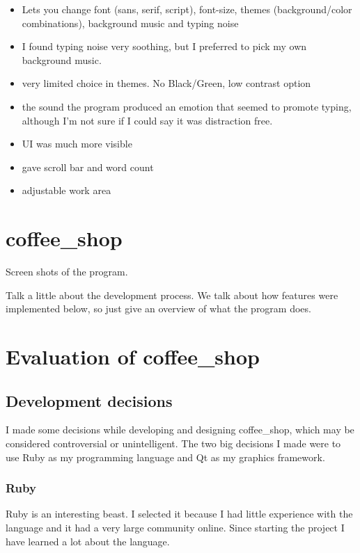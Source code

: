 \documentclass[11pt]{article}
\begin{document}
\begin{itemize}
\item Lets you change font (sans, serif, script), font-size, themes (background/color combinations), background music and typing noise
\item I found typing noise very soothing, but I preferred to pick my own background music.
\item very limited choice in themes. No Black/Green, low contrast option
\item the sound the program produced an emotion that seemed to promote typing, although I'm not sure if I could say it was distraction free.
\item UI was much more visible
\item gave scroll bar and word count
\item adjustable work area
\end{itemize}

\section{coffee\_shop}

Screen shots of the program.

Talk a little about the development process. We talk about how features were implemented below, so just give an overview of what the program does.

\section{Evaluation of coffee\_shop}

\subsection{Development decisions}

I made some decisions while developing and designing coffee\_shop, which may be considered controversial or unintelligent. The two big decisions I made were to use Ruby as my programming language and Qt as my graphics framework.

\subsubsection{Ruby}

Ruby is an interesting beast. I selected it because I had little experience with the language and it had a very large community online. Since starting the project I have learned a lot about the language.
\end{document}
